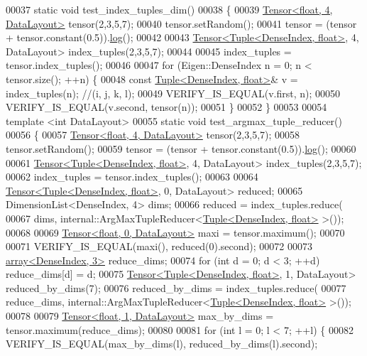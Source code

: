 \begin{DoxyCode}
00037 \textcolor{keyword}{static} \textcolor{keywordtype}{void} test\_index\_tuples\_dim()
00038 \{
00039   \hyperlink{class_eigen_1_1_tensor}{Tensor<float, 4, DataLayout>} tensor(2,3,5,7);
00040   tensor.setRandom();
00041   tensor = (tensor + tensor.constant(0.5)).\hyperlink{structlog}{log}();
00042 
00043   \hyperlink{class_eigen_1_1_tensor}{Tensor<Tuple<DenseIndex, float>}, 4, DataLayout> index\_tuples(2,3,5,7);
00044 
00045   index\_tuples = tensor.index\_tuples();
00046 
00047   \textcolor{keywordflow}{for} (Eigen::DenseIndex n = 0; n < tensor.size(); ++n) \{
00048     \textcolor{keyword}{const} \hyperlink{struct_eigen_1_1_tuple}{Tuple<DenseIndex, float>}& v = index\_tuples(n); \textcolor{comment}{//(i, j, k, l);}
00049     VERIFY\_IS\_EQUAL(v.first, n);
00050     VERIFY\_IS\_EQUAL(v.second, tensor(n));
00051   \}
00052 \}
00053 
00054 \textcolor{keyword}{template} <\textcolor{keywordtype}{int} DataLayout>
00055 \textcolor{keyword}{static} \textcolor{keywordtype}{void} test\_argmax\_tuple\_reducer()
00056 \{
00057   \hyperlink{class_eigen_1_1_tensor}{Tensor<float, 4, DataLayout>} tensor(2,3,5,7);
00058   tensor.setRandom();
00059   tensor = (tensor + tensor.constant(0.5)).\hyperlink{structlog}{log}();
00060 
00061   \hyperlink{class_eigen_1_1_tensor}{Tensor<Tuple<DenseIndex, float>}, 4, DataLayout> index\_tuples(2,3,5,7);
00062   index\_tuples = tensor.index\_tuples();
00063 
00064   \hyperlink{class_eigen_1_1_tensor}{Tensor<Tuple<DenseIndex, float>}, 0, DataLayout> reduced;
00065   DimensionList<DenseIndex, 4> dims;
00066   reduced = index\_tuples.reduce(
00067       dims, internal::ArgMaxTupleReducer<\hyperlink{struct_eigen_1_1_tuple}{Tuple<DenseIndex, float>} >());
00068 
00069   \hyperlink{class_eigen_1_1_tensor}{Tensor<float, 0, DataLayout>} maxi = tensor.maximum();
00070 
00071   VERIFY\_IS\_EQUAL(maxi(), reduced(0).second);
00072 
00073   \hyperlink{class_eigen_1_1array}{array<DenseIndex, 3>} reduce\_dims;
00074   \textcolor{keywordflow}{for} (\textcolor{keywordtype}{int} d = 0; d < 3; ++d) reduce\_dims[d] = d;
00075   \hyperlink{class_eigen_1_1_tensor}{Tensor<Tuple<DenseIndex, float>}, 1, DataLayout> reduced\_by\_dims(7);
00076   reduced\_by\_dims = index\_tuples.reduce(
00077       reduce\_dims, internal::ArgMaxTupleReducer<\hyperlink{struct_eigen_1_1_tuple}{Tuple<DenseIndex, float>} >());
00078 
00079   \hyperlink{class_eigen_1_1_tensor}{Tensor<float, 1, DataLayout>} max\_by\_dims = tensor.maximum(reduce\_dims);
00080 
00081   \textcolor{keywordflow}{for} (\textcolor{keywordtype}{int} l = 0; l < 7; ++l) \{
00082     VERIFY\_IS\_EQUAL(max\_by\_dims(l), reduced\_by\_dims(l).second);

\end{DoxyCode}
